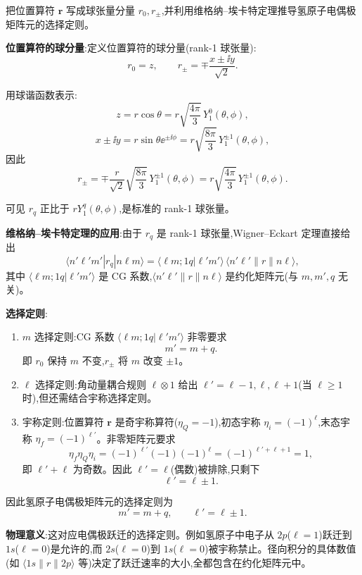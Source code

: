 \begin{question}
把位置算符 $\mathbf r$ 写成球张量分量 $r_0,r_\pm$,并利用维格纳--埃卡特定理推导氢原子电偶极矩阵元的选择定则。
\begin{solution}
	\textbf{位置算符的球分量}:定义位置算符的球分量(rank-1 球张量):
	\[
	r_0 = z,\qquad
	r_\pm = \mp\frac{x\pm\ii y}{\sqrt{2}}.
	\]

	用球谐函数表示:
	\[
	z = r\cos\theta = r\sqrt{\frac{4\pi}{3}}\,Y_1^0(\theta,\phi),
	\]
	\[
	x\pm\ii y = r\sin\theta \ee^{\pm\ii\phi} = r\sqrt{\frac{8\pi}{3}}\,Y_1^{\pm1}(\theta,\phi),
	\]
	因此
	\[
	r_\pm = \mp\frac{r}{\sqrt{2}}\sqrt{\frac{8\pi}{3}}\,Y_1^{\pm1}(\theta,\phi)
	= r\sqrt{\frac{4\pi}{3}}\,Y_1^{\pm1}(\theta,\phi).
	\]

	可见 $r_q$ 正比于 $r Y_1^q(\theta,\phi)$,是标准的 rank-1 球张量。

	\textbf{维格纳--埃卡特定理的应用}:由于 $r_q$ 是 rank-1 球张量,Wigner--Eckart 定理直接给出
	\[
	\langle n'\ell'm'|r_q|n\ell m\rangle
	= \langle \ell m;1q|\ell'm'\rangle\,
	\langle n'\ell'\|r\|n\ell\rangle,
	\]
	其中 $\langle \ell m;1q|\ell'm'\rangle$ 是 CG 系数,$\langle n'\ell'\|r\|n\ell\rangle$ 是约化矩阵元(与 $m,m',q$ 无关)。

	\textbf{选择定则}:
	\begin{enumerate}
	\item $m$ 选择定则:CG 系数 $\langle \ell m;1q|\ell'm'\rangle$ 非零要求
	\[
	m' = m + q.
	\]
	即 $r_0$ 保持 $m$ 不变,$r_\pm$ 将 $m$ 改变 $\pm1$。
	\item $\ell$ 选择定则:角动量耦合规则 $\ell\otimes1$ 给出 $\ell' = \ell-1,\ell,\ell+1$(当 $\ell\ge1$ 时),但还需结合宇称选择定则。
	\item 宇称定则:位置算符 $\mathbf r$ 是奇宇称算符($\eta_Q=-1$),初态宇称 $\eta_i=(-1)^\ell$,末态宇称 $\eta_f=(-1)^{\ell'}$。非零矩阵元要求
	\[
	\eta_f\eta_Q\eta_i = (-1)^{\ell'}(-1)(-1)^\ell = (-1)^{\ell'+\ell+1} = 1,
	\]
	即 $\ell'+\ell$ 为奇数。因此 $\ell'=\ell$(偶数)被排除,只剩下
	\[
	\ell' = \ell\pm1.
	\]
	\end{enumerate}

	因此氢原子电偶极矩阵元的选择定则为
	\[
	\boxed{m' = m+q,\qquad \ell' = \ell\pm1}.
	\]

	\textbf{物理意义}:这对应电偶极跃迁的选择定则。例如氢原子中电子从 $2p$($\ell=1$)跃迁到 $1s$($\ell=0$)是允许的,而 $2s$($\ell=0$)到 $1s$($\ell=0$)被宇称禁止。径向积分的具体数值(如 $\langle 1s\|r\|2p\rangle$ 等)决定了跃迁速率的大小,全都包含在约化矩阵元中。
	\end{solution}
\end{question}

